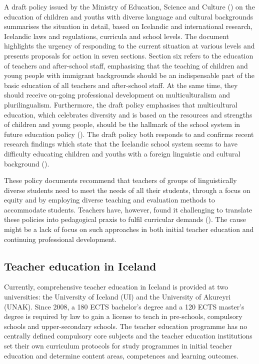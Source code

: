 \documentclass[output=paper]{langscibook}
\begin{document}
A draft policy issued by the Ministry of Education, Science and Culture (\citealt{Ministry_of_education_science_and_culture2020-3}) on the education of children and youths with diverse language and cultural backgrounds summarises the situation in detail, based on Icelandic and international research, Icelandic laws and regulations, curricula and school levels. The document highlights the urgency of responding to the current situation at various levels and presents proposals for action in seven sections. Section six refers to the education of teachers and after-school staff, emphasising that the teaching of children and young people with immigrant backgrounds should be an indispensable part of the basic education of all teachers and after-school staff. At the same time, they should receive on-going professional development on multiculturalism and plurilingualism. Furthermore, the draft policy emphasises that multicultural education, which celebrates diversity and is based on the resources and strengths of children and young people, should be the hallmark of the school system in future education policy (\citealt{Ministry_of_education_science_and_culture2020-3}). The draft policy both responds to and confirms recent research findings which state that the Icelandic school system seems to have difficulty educating children and youths with a foreign linguistic and cultural background (\citealt{Ministry_of_education_science_and_culture2020-3}).

These policy documents recommend that teachers of groups of linguistically diverse students   need to meet the needs of all their students, through a focus on equity and by employing diverse teaching and evaluation methods to accommodate students. Teachers have, however, found it challenging to translate these policies into pedagogical praxis to fulfil curricular demands (\citealt{Oskarsdottir2017-1}). The cause might be a lack of focus on such approaches in both initial teacher education and continuing professional development.  

\subsection{Teacher education in Iceland} %

Currently, comprehensive teacher education in Iceland is provided at two universities: the University of Iceland (UI) and the University of Akureyri (UNAK). Since 2008, a 180 ECTS bachelor’s degree and a 120 ECTS master’s degree is required by law to gain a license to teach in pre-schools, compulsory schools and upper-secondary schools. The teacher education programme has no centrally defined compulsory core subjects and the teacher education institutions set their own curriculum protocols for study programmes in initial teacher education and determine content areas, competences and learning outcomes.  
\end{document}
